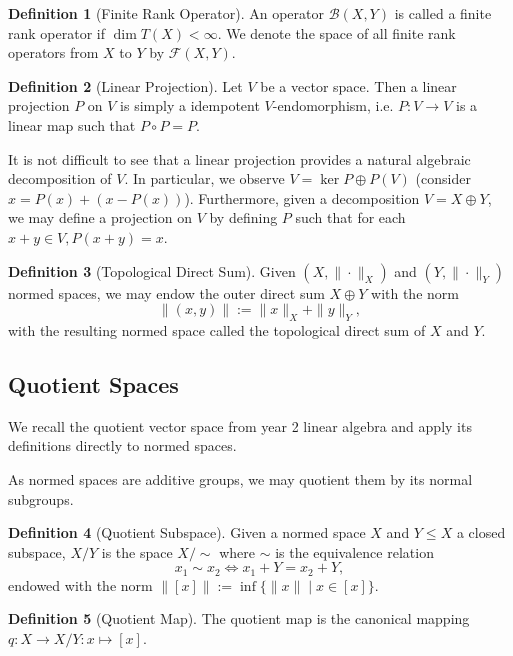 \documentclass[
]{article}
\theoremstyle{definition}
\theoremstyle{definition}
\newtheorem{definition}{Definition}[section]
\begin{document}
\begin{definition}[Finite Rank Operator]
  An operator \(\mathcal{B}(X, Y)\) is called a finite rank operator if 
  \(\dim T(X) < \infty\). We denote the space of all finite rank operators from 
  \(X\) to \(Y\) by \(\mathcal{F}(X, Y)\).
\end{definition}

\begin{definition}[Linear Projection]
  Let \(V\) be a vector space. Then a linear projection \(P\) on \(V\) is 
  simply a idempotent \(V\)-endomorphism, i.e. \(P : V \to V\) is a linear map 
  such that \(P \circ P = P\). 
\end{definition}

It is not difficult to see that a linear projection provides a natural algebraic 
decomposition of \(V\). In particular, we observe \(V = \ker P \oplus P(V)\) 
(consider \(x = P(x) + (x - P(x))\)). Furthermore, given a decomposition 
\(V = X \oplus Y\), we may define a projection on \(V\) by defining \(P\) 
such that for each \(x + y \in V, P(x + y) = x\).

\begin{definition}[Topological Direct Sum]
  Given \((X, \|\cdot\|_X)\) and \((Y, \|\cdot\|_Y)\) normed spaces, we may 
  endow the outer direct sum \(X \oplus Y\) with the norm 
  \[\|(x, y)\| := \|x\|_X + \|y\|_Y,\]
  with the resulting normed space called the topological direct sum of \(X\) and 
  \(Y\).
\end{definition}

\subsection{Quotient Spaces}

We recall the quotient vector space from year 2 linear algebra and apply its 
definitions directly to normed spaces.

As normed spaces are additive groups, we may quotient them by its normal subgroups. 

\begin{definition}[Quotient Subspace]
  Given a normed space \(X\) and \(Y \le X\) a closed subspace, \(X / Y\) is 
  the space \(X / \sim\) where \(\sim\) is the equivalence relation 
  \[x_1 \sim x_2 \iff x_1 + Y = x_2 + Y,\]
  endowed with the norm \(\|[x]\| := \inf \{\|x\| \mid x \in [x]\}\).
\end{definition}

\begin{definition}[Quotient Map]
  The quotient map is the canonical mapping \(q : X \to X / Y : x \mapsto [x]\).
\end{definition}
\end{document}
